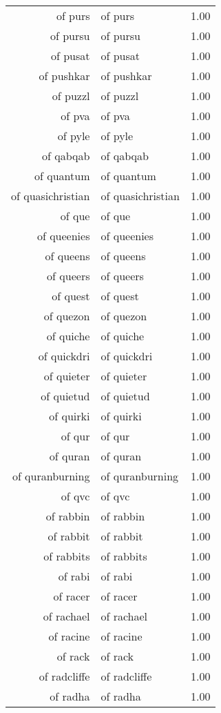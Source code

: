 \begin{table}[ht]
\begin{tabular}{rlr}
  of purs & of purs & 1.00 \\ 
  of pursu & of pursu & 1.00 \\ 
  of pusat & of pusat & 1.00 \\ 
  of pushkar & of pushkar & 1.00 \\ 
  of puzzl & of puzzl & 1.00 \\ 
  of pva & of pva & 1.00 \\ 
  of pyle & of pyle & 1.00 \\ 
  of qabqab & of qabqab & 1.00 \\ 
  of quantum & of quantum & 1.00 \\ 
  of quasichristian & of quasichristian & 1.00 \\ 
  of que & of que & 1.00 \\ 
  of queenies & of queenies & 1.00 \\ 
  of queens & of queens & 1.00 \\ 
  of queers & of queers & 1.00 \\ 
  of quest & of quest & 1.00 \\ 
  of quezon & of quezon & 1.00 \\ 
  of quiche & of quiche & 1.00 \\ 
  of quickdri & of quickdri & 1.00 \\ 
  of quieter & of quieter & 1.00 \\ 
  of quietud & of quietud & 1.00 \\ 
  of quirki & of quirki & 1.00 \\ 
  of qur & of qur & 1.00 \\ 
  of quran & of quran & 1.00 \\ 
  of quranburning & of quranburning & 1.00 \\ 
  of qvc & of qvc & 1.00 \\ 
  of rabbin & of rabbin & 1.00 \\ 
  of rabbit & of rabbit & 1.00 \\ 
  of rabbits & of rabbits & 1.00 \\ 
  of rabi & of rabi & 1.00 \\ 
  of racer & of racer & 1.00 \\ 
  of rachael & of rachael & 1.00 \\ 
  of racine & of racine & 1.00 \\ 
  of rack & of rack & 1.00 \\ 
  of radcliffe & of radcliffe & 1.00 \\ 
  of radha & of radha & 1.00 \\ 

\end{tabular}
\end{table}
